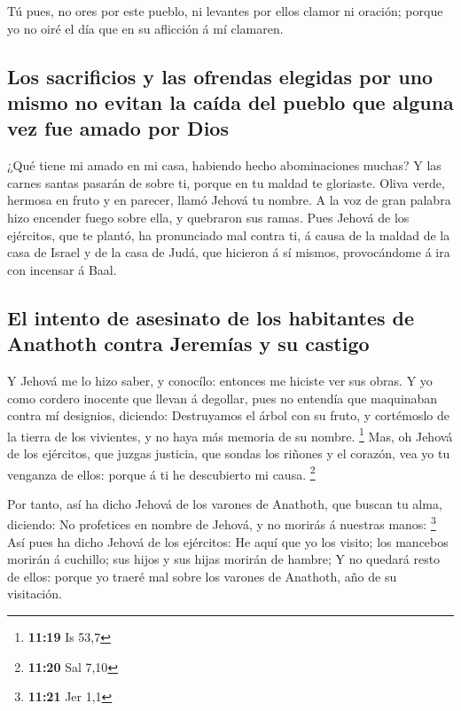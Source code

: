  Tú pues, no ores por este pueblo, ni levantes por ellos
clamor ni oración; porque yo no oiré el día que en su aflicción á mí
clamaren.

\hypertarget{los-sacrificios-y-las-ofrendas-elegidas-por-uno-mismo-no-evitan-la-cauxedda-del-pueblo-que-alguna-vez-fue-amado-por-dios}{%
\subsection{Los sacrificios y las ofrendas elegidas por uno mismo no
evitan la caída del pueblo que alguna vez fue amado por
Dios}\label{los-sacrificios-y-las-ofrendas-elegidas-por-uno-mismo-no-evitan-la-cauxedda-del-pueblo-que-alguna-vez-fue-amado-por-dios}}

 ¿Qué tiene mi amado en mi casa, habiendo hecho
abominaciones muchas? Y las carnes santas pasarán de sobre ti, porque en
tu maldad te gloriaste.  Oliva verde, hermosa en fruto y
en parecer, llamó Jehová tu nombre. A la voz de gran palabra hizo
encender fuego sobre ella, y quebraron sus ramas.  Pues
Jehová de los ejércitos, que te plantó, ha pronunciado mal contra ti, á
causa de la maldad de la casa de Israel y de la casa de Judá, que
hicieron á sí mismos, provocándome á ira con incensar á Baal.

\hypertarget{el-intento-de-asesinato-de-los-habitantes-de-anathoth-contra-jeremuxedas-y-su-castigo}{%
\subsection{El intento de asesinato de los habitantes de Anathoth contra
Jeremías y su
castigo}\label{el-intento-de-asesinato-de-los-habitantes-de-anathoth-contra-jeremuxedas-y-su-castigo}}

 Y Jehová me lo hizo saber, y conocílo: entonces me
hiciste ver sus obras.  Y yo como cordero inocente que
llevan á degollar, pues no entendía que maquinaban contra mí designios,
diciendo: Destruyamos el árbol con su fruto, y cortémoslo de la tierra
de los vivientes, y no haya más memoria de su nombre. \footnote{\textbf{11:19}
  Is 53,7}  Mas, oh Jehová de los ejércitos, que juzgas
justicia, que sondas los riñones y el corazón, vea yo tu venganza de
ellos: porque á ti he descubierto mi causa. \footnote{\textbf{11:20} Sal
  7,10}

 Por tanto, así ha dicho Jehová de los varones de
Anathoth, que buscan tu alma, diciendo: No profetices en nombre de
Jehová, y no morirás á nuestras manos: \footnote{\textbf{11:21} Jer 1,1}
 Así pues ha dicho Jehová de los ejércitos: He aquí que
yo los visito; los mancebos morirán á cuchillo; sus hijos y sus hijas
morirán de hambre;  Y no quedará resto de ellos: porque
yo traeré mal sobre los varones de Anathoth, año de su visitación.

